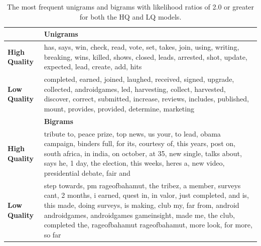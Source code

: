 \begin{table}[h]
	\centering

	\caption{The most frequent unigrams and bigrams with likelihood ratios of 2.0 or greater for both the HQ and LQ models.}
	\label{scoring:table:topTerms}

	\begin{tabulary}{\textwidth}{l L}

	\toprule
	 & \textbf{Unigrams} \\
	\midrule
	\textbf{High Quality} & has, says, win, check, read, vote, set, takes, join, using, writing, breaking, wins, killed, shows, closed, leads, arrested, shot, update, expected, lead, create, add, hits  \\
	\textbf{Low Quality} & completed, earned, joined, laughed, received, signed, upgrade, collected, androidgames, led, harvesting, collect, harvested, discover, correct, submitted, increase, reviews, includes, published, mount, provides, provided, determine, marketing \\
	\midrule
	&  \textbf{Bigrams} \\
	\midrule
	\textbf{High Quality} & tribute to, peace prize, top news, us your, to lead, obama campaign, binders full, for its, courtesy of, this years, post on, south africa, in india, on october, at 35, new single, talks about, says he, 1 day, the election, this weeks, heres a, new video, presidential debate, fair and \\
	\textbf{Low Quality} & step towards, pm rageofbahamut, the tribez, a member, surveys cant, 2 months, i earned, quest in, in valor, just completed, and is, this made, doing surveys, is making, club my, far from, android androidgames, androidgames gameinsight, made me, the club, completed the, rageofbahamut rageofbahamut, more look, for more, so far \\
	\bottomrule
\end{tabulary}
\end{table}
